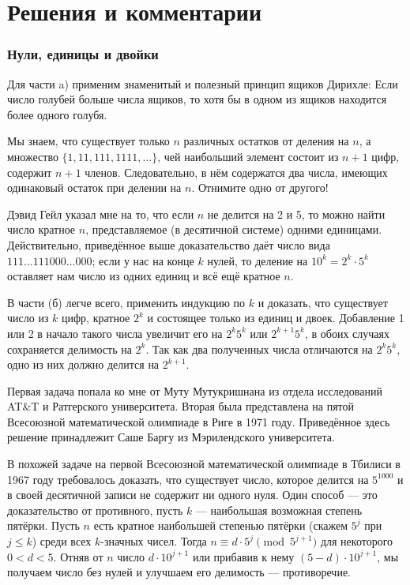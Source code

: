 \section*{Решения и комментарии}

\subsubsection*{Нули, единицы и двойки}%

Для части a) применим знаменитый и полезный принцип ящиков Дирихле:
Если число голубей больше числа ящиков, то хотя бы в одном из ящиков находится более одного голубя.

Мы знаем, что существует только $n$ различных остатков от деления на $n$, а множество $\{1, 11, 111, 1111,\dots\}$, чей наибольший элемент
состоит из $n+1$ цифр, содержит $n+1$ членов.
Следовательно, в нём содержатся два числа, имеющих одинаковый остаток при делении на $n$.
Отнимите одно от другого!
\heart

Дэвид Гейл %
указал мне на то, %
что если $n$ не делится на 2 и 5, то можно найти число кратное $n$, представляемое (в десятичной системе) одними единицами.
Действительно, приведённое выше доказательство даёт число вида $111\dots111000\dots000$; 
если у нас на конце $k$ нулей, то деление на $10^k=2^k\cdot 5^k$ оставляет нам число из одних единиц и всё ещё кратное $n$.

В части (б) легче всего, применить индукцию по $k$
и доказать, что существует число из $k$ цифр, кратное $2^k$ и состоящее только из единиц и двоек.
Добавление 1 или 2 в начало такого числа увеличит его на $2^k5^k$ или $2^{k+1}5^k$, в обоих случаях сохраняется делимость на $2^k$.
Так как два полученных числа отличаются на $2^k5^k$, одно из них должно делится на $2^{k+1}$.
\heart

Первая задача попала ко мне от Муту Мутукришнана %
из отдела исследований AT\&T и Ратгерского университета.
Вторая была представлена на пятой Всесоюзной математической олимпиаде в Риге в 1971 году.
Приведённое здесь решение принадлежит Саше Баргу %
из Мэрилендского университета.

\medskip

В похожей задаче на первой Всесоюзной математической олимпиаде в Тбилиси в 1967 году требовалось доказать, что существует число, которое делится на $5^{1000}$ и в своей десятичной записи не содержит ни одного нуля.
Один способ --- это доказательство от противного, 
пусть $k$ --- наибольшая возможная степень пятёрки.
Пусть $n$ есть кратное наибольшей степенью пятёрки (скажем $5^j$ при $j\le k$)
среди всех $k$-значных чисел.
Тогда $n\equiv d\cdot 5^j\pmod{5^{j+1}}$ для некоторого $0<d<5$.
Отняв от $n$ число $d\cdot 10^{j+1}$ или прибавив к нему $(5-d)\cdot 10^{j+1}$, мы получаем число без нулей и улучшаем его делимость --- противоречие.
\heart

